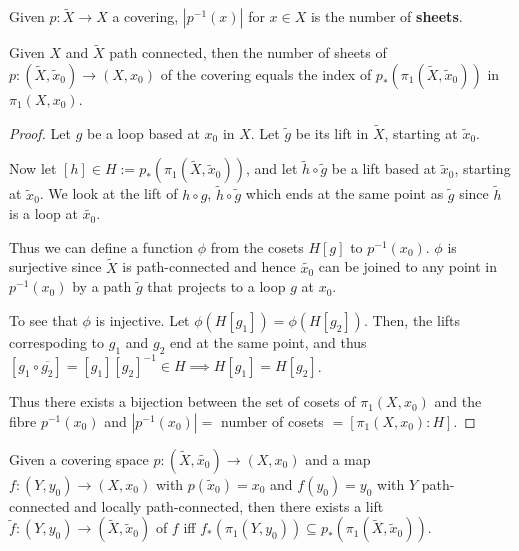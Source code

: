 \documentclass[12pt]{amsart}
\begin{document}
\begin{definition}
    Given $p: \widetilde{X} \to X$ a covering, $|p^{-1}(x)|$ for $x \in X$ is the number of \textbf{sheets}. 
\end{definition}

\begin{proposition}
    Given $X$ and $\widetilde{X}$ path connected, then the number of sheets of $p: (\widetilde{X}, \widetilde{x}_0) \to (X, x_0)$ of the covering equals the index of $p_*(\pi_1(\widetilde{X}, \widetilde{x}_0))$ in $\pi_1(X, x_0)$.
\end{proposition}

\begin{proof}
    Let $g$ be a loop based at $x_0$ in $X$. Let $\tilde{g}$ be its lift in $\widetilde{X}$, starting at $\widetilde{x}_0$. 
    
    Now let $[h] \in H:= p_*(\pi_1(\widetilde{X}, \widetilde{x}_0))$, and let $\widetilde{h} \circ \widetilde{g}$ be a lift based at $\widetilde{x}_0$, starting at $\widetilde{x}_0$. We look at the lift of ${h} \circ g$, $\widetilde{h} \circ \widetilde{g}$ which ends at the same point as $\widetilde{g}$ since $\widetilde{h}$ is a loop at $\widetilde{x_0}$. 

    Thus we can define a function $\phi$ from the cosets $H[g]$ to $p^{-1}(x_0)$. $\phi$ is surjective since $\widetilde{X}$ is path-connected and hence $\widetilde{x_0}$ can be joined to any point in $p^{-1}(x_0)$ by a path $\widetilde{g}$ that projects to a loop $g$ at $x_0$. 

    To see that $\phi$ is injective. Let $\phi(H[g_1]) = \phi(H[g_2])$. Then, the lifts correspoding to $g_1$ and $g_2$ end at the same point, and thus $[g_1 \circ \overline{g_2}] = [g_1][{g_2}]^{-1} \in H \implies H[g_1] = H[g_2]$.  

    Thus there exists a bijection between the set of cosets of $\pi_1(X, x_0)$ and the fibre $p^{-1}(x_0)$ and $|p^{-1}(x_0)| = $ number of cosets $= [\pi_1(X, x_0) : H]$. 
\end{proof}

\begin{proposition}
    Given a covering space $p: (\widetilde{X}, \widetilde{x_0}) \to (X, x_0)$ and a map $f: (Y, y_0) \to (X, x_0)$ with $p(\widetilde{x}_0) = x_0$ and $f(y_0) = y_0$ with $Y$ path-connected and locally path-connected, then there exists a lift $\widetilde{f}: (Y, y_0) \to (\widetilde{X}, \widetilde{x}_0)$ of $f$ iff $f_{*}(\pi_1(Y, y_0)) \subseteq p_*(\pi_1(\widetilde{X}, \widetilde{x}_0))$.
\end{proposition}
\end{document}
